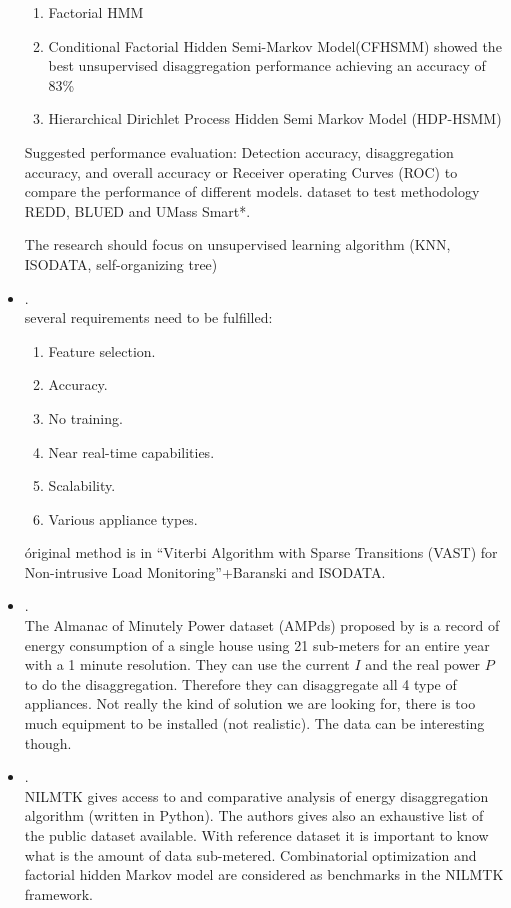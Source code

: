 \begin{itemize}
\begin{enumerate}
	 	\item Factorial HMM
	 	\item Conditional Factorial Hidden Semi-Markov Model(CFHSMM) showed the best unsupervised disaggregation performance achieving an accuracy of 83\%
	 	\item Hierarchical Dirichlet Process Hidden Semi Markov Model (HDP-HSMM)
	 \end{enumerate}
	 Suggested performance evaluation: Detection accuracy, disaggregation accuracy, and overall accuracy or Receiver operating Curves (ROC) to compare the performance of different models.
	 dataset to test methodology REDD, BLUED and UMass Smart*.

	 The research should focus on unsupervised learning algorithm (KNN, ISODATA, self-organizing tree)
	\item {}.\\
	 several requirements need to be fulfilled:
	 \begin{enumerate}
	 	\item Feature selection.
	 	\item Accuracy.
	 	\item No training.
	 	\item Near real-time capabilities.
	 	\item Scalability.
	 	\item Various appliance types.
	 \end{enumerate}
	 óriginal method is in “Viterbi Algorithm with Sparse Transitions (VAST) for Non-intrusive Load Monitoring”+Baranski and ISODATA\@.
	\item {}.\\
	 The Almanac of Minutely Power dataset (AMPds) proposed by \citeauthor{makonin2013} is a record of energy consumption of a single house using 21 sub-meters for an entire year with a 1 minute resolution. They can use the current $I$ and the real power $P$ to do the disaggregation. Therefore they can disaggregate all 4 type of appliances. Not really the kind of solution we are looking for, there is too much equipment to be installed (not realistic). The data can be interesting though.
	\item {}.\\
	 NILMTK gives access to and comparative analysis of energy disaggregation algorithm (written in Python). The authors gives also an exhaustive list of the public dataset available. With reference dataset it is important to know what is the amount of data sub-metered. Combinatorial optimization and factorial hidden Markov model are considered as benchmarks in the NILMTK framework.

\end{itemize}

